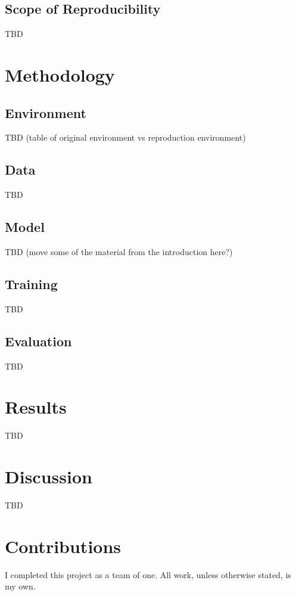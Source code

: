 \documentclass[letterpaper]{article} %
\begin{document}
\subsection{Scope of Reproducibility}

TBD

\section{Methodology}

\subsection{Environment}

TBD (table of original environment vs reproduction environment)

\subsection{Data}

TBD

\subsection{Model}

TBD (move some of the material from the introduction here?)

\subsection{Training}

TBD

\subsection{Evaluation}

TBD

\section{Results}

TBD

\section{Discussion}

TBD

\section{Contributions}

I completed this project as a team of one. All work, unless otherwise stated, is my own.


\end{document}
